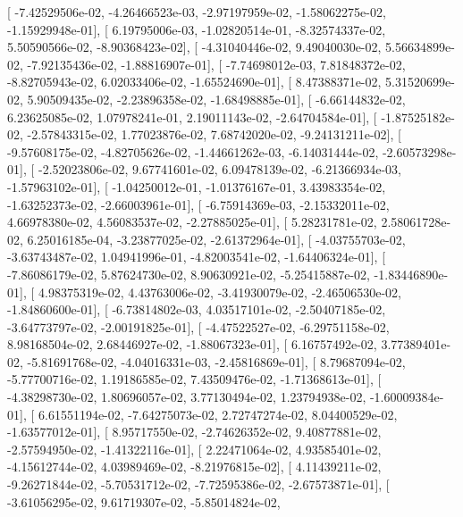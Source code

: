 \documentclass{article}
\begin{document}
       [ -7.42529506e-02,  -4.26466523e-03,  -2.97197959e-02,
         -1.58062275e-02,  -1.15929948e-01],
       [  6.19795006e-03,  -1.02820514e-01,  -8.32574337e-02,
          5.50590566e-02,  -8.90368423e-02],
       [ -4.31040446e-02,   9.49040030e-02,   5.56634899e-02,
         -7.92135436e-02,  -1.88816907e-01],
       [ -7.74698012e-03,   7.81848372e-02,  -8.82705943e-02,
          6.02033406e-02,  -1.65524690e-01],
       [  8.47388371e-02,   5.31520699e-02,   5.90509435e-02,
         -2.23896358e-02,  -1.68498885e-01],
       [ -6.66144832e-02,   6.23625085e-02,   1.07978241e-01,
          2.19011143e-02,  -2.64704584e-01],
       [ -1.87525182e-02,  -2.57843315e-02,   1.77023876e-02,
          7.68742020e-02,  -9.24131211e-02],
       [ -9.57608175e-02,  -4.82705626e-02,  -1.44661262e-03,
         -6.14031444e-02,  -2.60573298e-01],
       [ -2.52023806e-02,   9.67741601e-02,   6.09478139e-02,
         -6.21366934e-03,  -1.57963102e-01],
       [ -1.04250012e-01,  -1.01376167e-01,   3.43983354e-02,
         -1.63252373e-02,  -2.66003961e-01],
       [ -6.75914369e-03,  -2.15332011e-02,   4.66978380e-02,
          4.56083537e-02,  -2.27885025e-01],
       [  5.28231781e-02,   2.58061728e-02,   6.25016185e-04,
         -3.23877025e-02,  -2.61372964e-01],
       [ -4.03755703e-02,  -3.63743487e-02,   1.04941996e-01,
         -4.82003541e-02,  -1.64406324e-01],
       [ -7.86086179e-02,   5.87624730e-02,   8.90630921e-02,
         -5.25415887e-02,  -1.83446890e-01],
       [  4.98375319e-02,   4.43763006e-02,  -3.41930079e-02,
         -2.46506530e-02,  -1.84860600e-01],
       [ -6.73814802e-03,   4.03517101e-02,  -2.50407185e-02,
         -3.64773797e-02,  -2.00191825e-01],
       [ -4.47522527e-02,  -6.29751158e-02,   8.98168504e-02,
          2.68446927e-02,  -1.88067323e-01],
       [  6.16757492e-02,   3.77389401e-02,  -5.81691768e-02,
         -4.04016331e-03,  -2.45816869e-01],
       [  8.79687094e-02,  -5.77700716e-02,   1.19186585e-02,
          7.43509476e-02,  -1.71368613e-01],
       [ -4.38298730e-02,   1.80696057e-02,   3.77130494e-02,
          1.23794938e-02,  -1.60009384e-01],
       [  6.61551194e-02,  -7.64275073e-02,   2.72747274e-02,
          8.04400529e-02,  -1.63577012e-01],
       [  8.95717550e-02,  -2.74626352e-02,   9.40877881e-02,
         -2.57594950e-02,  -1.41322116e-01],
       [  2.22471064e-02,   4.93585401e-02,  -4.15612744e-02,
          4.03989469e-02,  -8.21976815e-02],
       [  4.11439211e-02,  -9.26271844e-02,  -5.70531712e-02,
         -7.72595386e-02,  -2.67573871e-01],
       [ -3.61056295e-02,   9.61719307e-02,  -5.85014824e-02,
\end{document}
